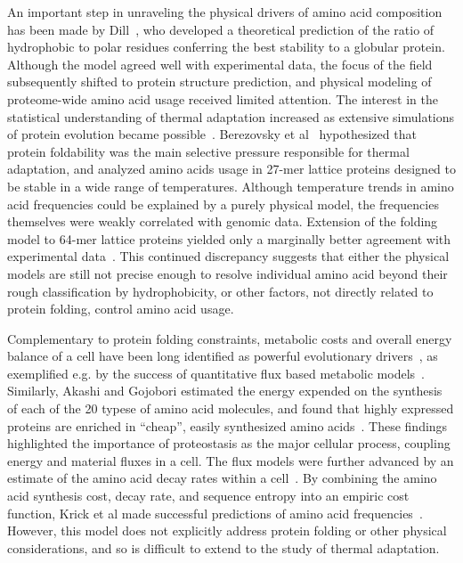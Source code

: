 \documentclass[10pt,letterpaper]{article}
\begin{document}
An important step in unraveling the physical drivers of amino acid composition has been made by Dill~\cite{Dill1985Theory}, who developed a theoretical prediction of the ratio of hydrophobic to polar residues conferring the best stability to a globular protein. Although the model agreed well with experimental data, the focus of the field subsequently shifted to protein structure prediction, and physical modeling of proteome-wide amino acid usage received limited attention.  The interest in the statistical understanding of thermal adaptation increased as extensive simulations of protein evolution became possible~\cite{Taverna2002Why,Bloom2006Protein,Goldstein2008The}. Berezovsky et al~\cite{Berezovsky2007Positive} hypothesized that protein foldability was the main selective pressure responsible for thermal adaptation, and analyzed amino acids usage in 27-mer lattice proteins designed to be stable in a wide range of temperatures. Although temperature trends in amino acid frequencies could be explained by a purely physical model, the frequencies themselves were weakly correlated with genomic data. Extension of the folding model to 64-mer lattice proteins yielded only a marginally better agreement with experimental data~\cite{Venev2015Massively}. This continued discrepancy suggests that either the physical models are still not precise enough to resolve individual amino acid  beyond their rough classification by hydrophobicity, or other factors, not directly related to protein folding, control amino acid usage.

Complementary to protein folding constraints, metabolic costs and overall energy balance of a cell have been long identified as powerful evolutionary drivers~\cite{Pal2006An}, as exemplified e.g. by the success of quantitative flux based metabolic models~\cite{Varma1994Metabolic,Price2004Genome}. Similarly, Akashi and Gojobori estimated the energy expended on the synthesis of each of the 20 typese of amino acid molecules, and found that highly expressed proteins are enriched in ``cheap'', easily synthesized amino acids~\cite{Akashi2002Metabolic}. These findings highlighted the importance of proteostasis as the major cellular process, coupling energy and material fluxes in a cell. The flux models were further advanced by an estimate of the amino acid decay rates within a cell~\cite{Krick2014Amino}. By combining the amino acid synthesis cost, decay rate, and sequence entropy into an empiric cost function, Krick et al made successful predictions of amino acid frequencies~\cite{Krick2014Amino}. However, this model does not explicitly address protein folding or other physical considerations, and so is difficult to extend to the study of thermal adaptation.
\end{document}

